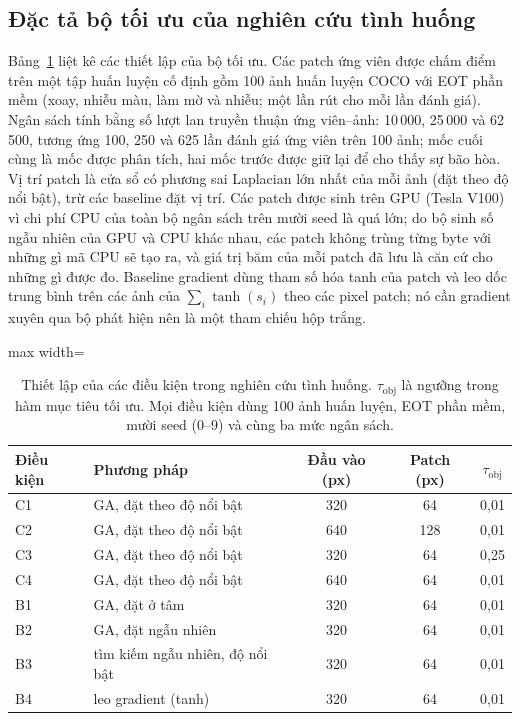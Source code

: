 \documentclass[a4paper,fleqn]{cas-dc}
\begin{document}
\subsection{Đặc tả bộ tối ưu của nghiên cứu tình huống}
Bảng~\ref{tab:spec} liệt kê các thiết lập của bộ tối ưu. Các patch ứng viên được chấm điểm trên một tập huấn luyện cố định gồm 100 ảnh huấn luyện COCO \cite{lin2014coco} với EOT phần mềm (xoay, nhiễu màu, làm mờ và nhiễu; một lần rút cho mỗi lần đánh giá). Ngân sách tính bằng số lượt lan truyền thuận ứng viên--ảnh: 10\,000, 25\,000 và 62\,500, tương ứng 100, 250 và 625 lần đánh giá ứng viên trên 100 ảnh; mốc cuối cùng là mốc được phân tích, hai mốc trước được giữ lại để cho thấy sự bão hòa. Vị trí patch là cửa sổ có phương sai Laplacian lớn nhất của mỗi ảnh (đặt theo độ nổi bật), trừ các baseline đặt vị trí. Các patch được sinh trên GPU (Tesla V100) vì chi phí CPU của toàn bộ ngân sách trên mười seed là quá lớn; do bộ sinh số ngẫu nhiên của GPU và CPU khác nhau, các patch không trùng từng byte với những gì mã CPU sẽ tạo ra, và giá trị băm của mỗi patch đã lưu là căn cứ cho những gì được đo. Baseline gradient dùng tham số hóa tanh của patch và leo dốc trung bình trên các ảnh của $\sum_i \tanh(s_i)$ theo các pixel patch; nó cần gradient xuyên qua bộ phát hiện nên là một tham chiếu hộp trắng.

\begin{table}[!tp]
\centering\small
\caption{Thiết lập của các điều kiện trong nghiên cứu tình huống. $\tau_{\mathrm{obj}}$ là ngưỡng trong hàm mục tiêu tối ưu. Mọi điều kiện dùng 100 ảnh huấn luyện, EOT phần mềm, mười seed (0--9) và cùng ba mức ngân sách.}
\label{tab:spec}
\begin{adjustbox}{max width=\textwidth}
\begin{tabular}{@{}llccc@{}}
\toprule
Điều kiện & Phương pháp & Đầu vào (px) & Patch (px) & $\tau_{\mathrm{obj}}$ \\
\midrule
C1 & GA, đặt theo độ nổi bật & 320 & 64 & 0,01 \\
C2 & GA, đặt theo độ nổi bật & 640 & 128 & 0,01 \\
C3 & GA, đặt theo độ nổi bật & 320 & 64 & 0,25 \\
C4 & GA, đặt theo độ nổi bật & 640 & 64 & 0,01 \\
B1 & GA, đặt ở tâm & 320 & 64 & 0,01 \\
B2 & GA, đặt ngẫu nhiên & 320 & 64 & 0,01 \\
B3 & tìm kiếm ngẫu nhiên, độ nổi bật & 320 & 64 & 0,01 \\
B4 & leo gradient (tanh) & 320 & 64 & 0,01 \\
\bottomrule
\end{tabular}
\end{adjustbox}
\end{table}
\end{document}
